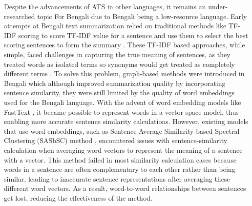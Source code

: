 Despite the advancements of ATS in other languages, it remains an under-researched topic For Bengali due to Bengali being a low-resource language. Early attempts at Bengali text summarization relied on traditional methods like TF-IDF scoring to score TF-IDF value for a sentence and use them to select the best scoring sentences to form the summary \cite{Akter-2017-tfidf-3, das-2022-tfidf, sarkar-2012-tfidf, sarkar-2012-tfidf-2}. These TF-IDF based approaches, while simple, faced challenges in capturing the true meaning of sentences, as they treated words as isolated terms so synonyms would get treated as completely different terms \cite{tas-2017-rev-text-sum-2}. To solve this problem, graph-based methods were introduced in Bengali which although improved summarization quality by incorporating sentence similarity, they were still limited by the quality of word embeddings used for the Bengali language. With the advent of word embedding models like FastText \cite{grave-etal-2018-fasttext}, it became possible to represent words in a vector space model, thus enabling more accurate sentence similarity calculations. However, existing models that use word embeddings, such as Sentence Average Similarity-based Spectral Clustering (SASbSC) method \cite{roychowdhury-etal-2022-spectral-base}, encountered issues with sentence-similarity calculation when averaging word vectors to represent the meaning of a sentence with a vector. This method failed in most similarity calculation cases because words in a sentence are often complementary to each other rather than being similar, leading to inaccurate sentence representations after averaging these different word vectors. As a result, word-to-word relationships between sentences get lost, reducing the effectiveness of the method.\\

